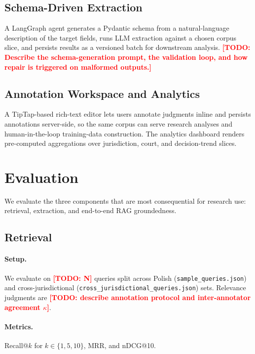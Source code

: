 \documentclass[11pt]{article}
\newcommand{\todo}[1]{\textcolor{red}{\textbf{[TODO: #1]}}}
\begin{document}
\subsection{Schema-Driven Extraction}
\label{sec:extraction}

A LangGraph agent generates a Pydantic schema from a natural-language
description of the target fields, runs LLM extraction against a chosen
corpus slice, and persists results as a versioned batch for downstream
analysis. \todo{Describe the schema-generation prompt, the validation
loop, and how repair is triggered on malformed outputs.}

\subsection{Annotation Workspace and Analytics}
\label{sec:annotation}

A TipTap-based rich-text editor lets users annotate judgments inline
and persists annotations server-side, so the same corpus can serve
research analyses and human-in-the-loop training-data construction.
The analytics dashboard renders pre-computed aggregations over
jurisdiction, court, and decision-trend slices.

\section{Evaluation}
\label{sec:eval}

We evaluate the three components that are most consequential for
research use: retrieval, extraction, and end-to-end RAG groundedness.

\subsection{Retrieval}
\label{sec:eval-retrieval}

\paragraph{Setup.} We evaluate on \todo{N} queries split across
Polish (\texttt{sample\_queries.json}) and cross-jurisdictional
(\texttt{cross\_jurisdictional\_queries.json}) sets. Relevance judgments
are \todo{describe annotation protocol and inter-annotator agreement
$\kappa$}.

\paragraph{Metrics.} Recall@$k$ for $k \in \{1, 5, 10\}$, MRR, and
nDCG@10.
\end{document}
